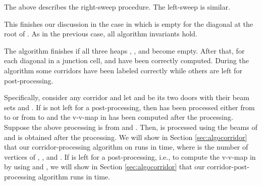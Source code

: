 \documentclass[english,runningheads,11pt]{llncs-revised}
\begin{document}
The above describes the right-sweep procedure. The
left-sweep is similar.

This finishes our discussion in the case in which  is empty for
the diagonal  at the root of . As in the previous case, all
algorithm invariants hold.



The algorithm finishes if all three heaps , , and  become
empty. After that, for each diagonal  in a junction cell, 
and  have been correctly computed. During the algorithm
some corridors have been labeled correctly while others are left for
post-processing.



Specifically, consider any corridor  and let  and  be
its two doors with their beam sets  and . If  is not left for a post-processing, then  has been processed either from  to  or from  to  and the v-v-map in  has been computed after the processing. Suppose the above processing is from  and . Then,  is processed using the beams of  and  is obtained after the processing.
We will show in Section
\ref{sec:algocorridor} that our corridor-processing algorithm on  runs in  time, where  is the number of vertices of ,
, and .
If  is left for a post-processing, i.e., to compute the
v-v-map in  by using  and , we will show in
Section \ref{sec:algocorridor} that our
corridor-post-processing algorithm runs in  time.
\end{document}
